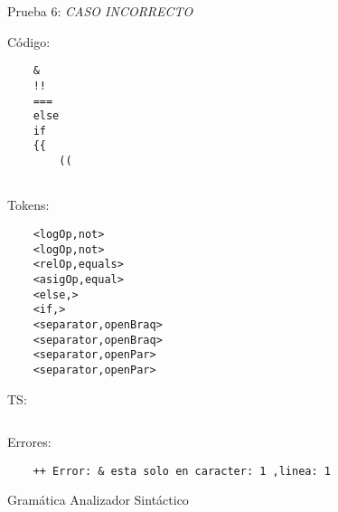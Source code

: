 \documentclass{article}
\begin{document}
Prueba 6: \textit{CASO INCORRECTO}%
\begin{flushleft}
Código:
\begin{verbatim}
    &
    !!
    ===
    else
    if
    {{
        ((
               
\end{verbatim}

Tokens:
\begin{verbatim}
    <logOp,not>
    <logOp,not>
    <relOp,equals>
    <asigOp,equal>
    <else,>
    <if,>
    <separator,openBraq>
    <separator,openBraq>
    <separator,openPar>
    <separator,openPar>
\end{verbatim}
    TS:
\begin{verbatim}

\end{verbatim}
Errores:
\begin{verbatim}
    ++ Error: & esta solo en caracter: 1 ,linea: 1
\end{verbatim}
\end{flushleft}
\vspace{3cm}
Gramática Analizador Sintáctico
\end{document}
